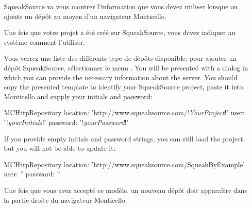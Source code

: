 \documentclass[a4paper,10pt,twoside]{book}
\begin{document}
SqueakSource va vous montrer l'information que vous devez utiliser lorsque on ajoute un dépôt au moyen d'un navigateur Monticello.

Une fois que votre projet a été créé sur SqueakSource, vous devez indiquer au système \squeak comment l'utiliser.

  Vous verrez une liste des différents type de dépôts disponible; pour ajouter un dépôt SqueakSource, sélectionner le menu . You will be presented with a dialog in which you can provide the necessary information about the server.
You should copy the presented template to identify your SqueakSource project, paste it into Monticello and supply your initials and password:

\begin{code}{}
MCHttpRepository 
    location: 'http://www.squeaksource.com/!\emph{YourProject}!'
    user: '!\emph{yourInitials}!' 
    password: '!\emph{yourPassword}!'
\end{code}   

\noindent
If you provide empty initials and password strings, you can still load the project, but you will not be able to update it:

\begin{code}{}
MCHttpRepository 
    location: 'http://www.squeaksource.com/SqueakByExample'
    user: '' 
    password: ''
\end{code}   

Une fois que vous avez accepté ce modèle, un nouveau dépôt doit apparaître dans la partie droite du navigateur Monticello.
\end{document}
